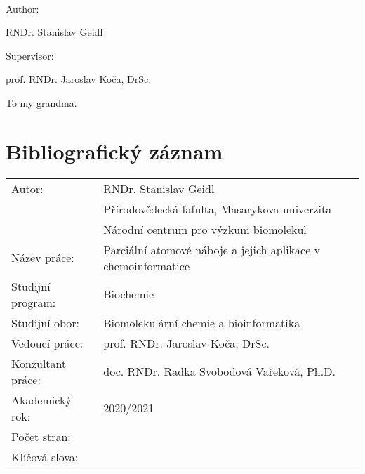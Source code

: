 \documentclass[12pt,a4paper,oneside,final]{book}
\begin{document}
 \vspace{8cm}

  \begin{center}
      {\fontsize{28pt}{26pt}\selectfont{Dissertation}}\\
      \vspace{1ex}
      \vspace{6ex}
      {\fontsize{24pt}{26pt}\selectfont{
          Partial Atomic Charges and Their Chemoinformatics Application
      }}
  \end{center}

\vspace*{9mm}

\begin{center}
  Author:

  RNDr. Stanislav Geidl

  Supervisor: 

  prof. RNDr. Jaroslav Koča, DrSc.
\end{center}

\vfill


\begin{center}
{\fontsize{20pt}{28pt}\selectfont{Brno 2021} \hfill \selectfont{Stanislav Geidl}}
\end{center}
\normalsize
\clearpage

\begin{center}
\vspace*{10cm}
To my grandma.
\end{center}
\normalsize
\clearpage

\vfill
\section*{Bibliografický záznam}
\begin{tabular}{ ll } 
  Autor:            & RNDr. Stanislav Geidl \\
                    & Přírodovědecká fafulta, Masarykova univerzita \\
                    & Národní centrum pro výzkum biomolekul \\
  Název práce:      & Parciální atomové náboje a jejich aplikace v chemoinformatice \\ 
  Studijní program: & Biochemie \\
  Studijní obor:    & Biomolekulární chemie a bioinformatika \\
  Vedoucí práce:    & prof. RNDr. Jaroslav Koča, DrSc. \\
  Konzultant práce: & doc. RNDr. Radka Svobodová Vařeková, Ph.D. \\
  Akademický rok:   & 2020/2021 \\
  Počet stran:      & \\
  Klíčová slova:    & \\
\end{tabular}
\clearpage
\end{document}
